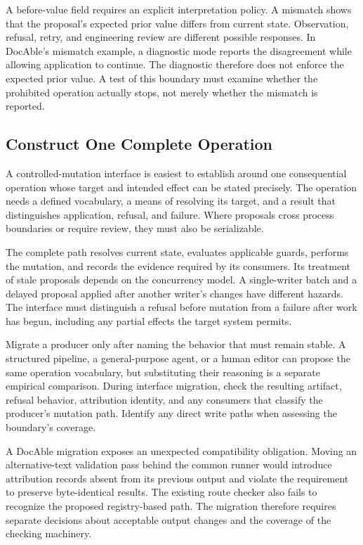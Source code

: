 A before-value field requires an explicit interpretation policy. A mismatch shows that the proposal's expected prior value differs from current state. Observation, refusal, retry, and engineering review are different possible responses. In DocAble's mismatch example, a diagnostic mode reports the disagreement while allowing application to continue. The diagnostic therefore does not enforce the expected prior value. A test of this boundary must examine whether the prohibited operation actually stops, not merely whether the mismatch is reported.

\subsection*{Construct One Complete Operation}

A controlled-mutation interface is easiest to establish around one consequential operation whose target and intended effect can be stated precisely. The operation needs a defined vocabulary, a means of resolving its target, and a result that distinguishes application, refusal, and failure. Where proposals cross process boundaries or require review, they must also be serializable.

The complete path resolves current state, evaluates applicable guards, performs the mutation, and records the evidence required by its consumers. Its treatment of stale proposals depends on the concurrency model. A single-writer batch and a delayed proposal applied after another writer's changes have different hazards. The interface must distinguish a refusal before mutation from a failure after work has begun, including any partial effects the target system permits.

Migrate a producer only after naming the behavior that must remain stable. A structured pipeline, a general-purpose agent, or a human editor can propose the same operation vocabulary, but substituting their reasoning is a separate empirical comparison. During interface migration, check the resulting artifact, refusal behavior, attribution identity, and any consumers that classify the producer's mutation path. Identify any direct write paths when assessing the boundary's coverage.

A DocAble migration exposes an unexpected compatibility obligation. Moving an alternative-text validation pass behind the common runner would introduce attribution records absent from its previous output and violate the requirement to preserve byte-identical results. The existing route checker also fails to recognize the proposed registry-based path. The migration therefore requires separate decisions about acceptable output changes and the coverage of the checking machinery.

